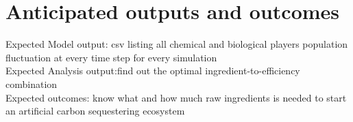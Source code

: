 \documentclass[a4paper, 11pt]{article}
\begin{document}
\section{Anticipated outputs and outcomes}
Expected Model output: csv listing all chemical and biological players population fluctuation at every time step for every simulation\\
Expected Analysis output:find out the optimal ingredient-to-efficiency combination\\
Expected outcomes: know what and how much raw ingredients is needed to start an artificial carbon sequestering ecosystem
\end{document}
